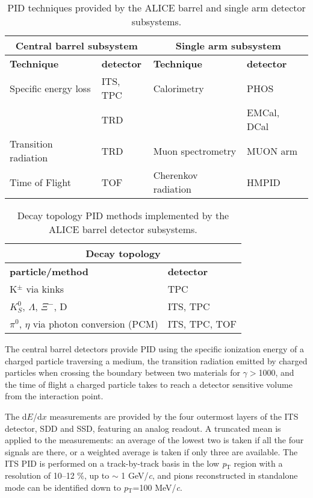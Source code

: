 \documentclass[10pt]{article}
\begin{document}
\begin{table}[h]
\begin{center}
\begin{tabular}{ll|ll}
\multicolumn{2}{c|}{\bf{Central barrel subsystem}} & \multicolumn{2}{c}{\bf{Single arm subsystem}} \\
\hline
\bf{Technique} & \bf{detector} & \bf{Technique} & \bf{detector}  \\
\hline 
 Specific energy loss & ITS, TPC &  Calorimetry & PHOS   \\
& TRD & & EMCal, DCal \\
\hline
Transition radiation & TRD &  Muon spectrometry & MUON arm \\
\hline
Time of Flight & TOF & Cherenkov radiation & HMPID  \\
\hline
\end{tabular}
\caption{PID techniques provided by the ALICE barrel and single arm detector subsystems.}
\label{tab:table1}
\end{center}
\end{table}
\begin{table}[h]
\begin{center}
\vspace{-5mm}
\begin{tabular}{ll}
 \multicolumn{2}{c}{\bf{Decay topology}} \\
\hline
\bf{particle/method} & \bf{detector} \\
\hline 
  K$^{\pm}$ via kinks & TPC \\
\hline
$K^{0}_{S}$, $\Lambda$, $\Xi ^{-}$, D & ITS, TPC \\
\hline
$\pi^{0}$, $\eta$ via photon conversion (PCM) & ITS, TPC, TOF \\
\hline
\end{tabular}
\caption{Decay topology PID methods implemented by the ALICE barrel detector subsystems.}
\label{tab:table2}
\end{center}
\vspace{-1mm}
\end{table}
\vspace{-1mm}
The central barrel detectors provide PID using the specific ionization energy of a charged particle traversing a medium, the transition radiation emitted by charged particles when crossing the boundary between two materials for $\gamma >$1000, and the time of flight a charged particle takes to reach a detector sensitive volume from the interaction point.

The d$E$/d$x$ measurements are provided by the four outermost layers of the ITS detector, SDD and SSD, featuring an  analog readout. A truncated mean is applied to the measurements: an average of the lowest two is taken if all the four signals are there, or a weighted average is taken if only three are available. The ITS PID is performed on a track-by-track basis in the low {\it p}$_{\mathrm{T}}$ region with a resolution of 10--12 $\%$, up to $\sim$ 1 GeV/{\it c}, and pions reconstructed in standalone mode can be identified down to  {\it p}$_{\mathrm{T}}$=100 MeV/{\it c}. 
\end{document}
